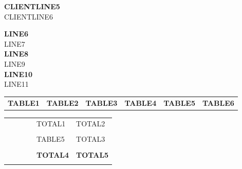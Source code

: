 \documentclass[a4paper]{article}
\newcommand{\lline}[2]{{\color{#1}\noindent\makebox[\linewidth][c]{\rule{1.02\textwidth}{#2}}}}
\begin{document}
    \vspace*{10pt} %
    \noindent
    \begin{minipage}[b]{0.5\textwidth}
        \vspace{0pt} %
        \begin{flushleft}
            \normalsize{\textbf{CLIENTLINE5}} \\
            \normalsize{CLIENTLINE6}
        \end{flushleft}
    \end{minipage}
    \hfill
    \begin{minipage}[b]{0.3\textwidth}
        \vspace{0pt} %
        \begin{flushright}
            \normalsize{\textbf{LINE6}} \\
            \normalsize{LINE7} \\
            \normalsize{\textbf{LINE8}} \\
            \normalsize{LINE9} \\
            \normalsize{\textbf{LINE10}} \\
            \normalsize{LINE11} \\
        \end{flushright}
    \end{minipage}

    \vspace*{20pt} %
    \noindent

    \begin{tabularx}{\linewidth}{
            >{\hsize=2.25\hsize}X
            >{\hsize=0.75\hsize}X
            >{\hsize=0.75\hsize}X
            >{\hsize=0.75\hsize}X
            >{\hsize=0.75\hsize}X
            >{\raggedleft\arraybackslash\hsize=0.75\hsize}X}
        \textbf{TABLE1} & \textbf{TABLE2} & \textbf{TABLE3} & \textbf{TABLE4} & \textbf{TABLE5} & \textbf{TABLE6}
    \end{tabularx}
    \vspace*{-10pt}
    \lline{blue}{0.8pt}

    \vspace*{10pt}

    \begin{tabularx}{\linewidth}{
            >{\hsize=2\hsize}X
            >{\hsize=1\hsize}X
            >{\hsize=0.5\hsize}X
            >{\hsize=0.5\hsize}X
            >{\raggedleft\arraybackslash\hsize=1\hsize}X
            >{\raggedleft\arraybackslash\hsize=1\hsize}X}
        &&&& TOTAL1 & TOTAL2 \\ \\
        &&&& TABLE5 & TOTAL3 \\ \\
        &&&& \textbf{TOTAL4} & \textbf{TOTAL5} \\ \\
    \end{tabularx}
\end{document}
